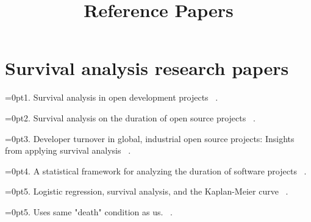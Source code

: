 \documentclass{article}
\title{Reference Papers}
\begin{document}
\maketitle
\section*{Survival analysis research papers}
\parindent=0pt1. Survival analysis in open development projects ~\cite{ortega2009survival}.

\parindent=0pt2. Survival analysis on the duration of open source projects ~\cite{samoladas2010survival}.

\parindent=0pt3. Developer turnover in global, industrial open source projects: Insights from applying survival analysis ~\cite{lin2017developer}.

\parindent=0pt4. A statistical framework for analyzing the duration of software projects
~\cite{sentas2008statistical}.

\parindent=0pt5. Logistic regression, survival analysis, and the Kaplan-Meier curve
~\cite{efron1988logistic}.

\parindent=0pt5. Uses same "death" condition as us.
~\cite{evangelopoulos}.



\end{document}
